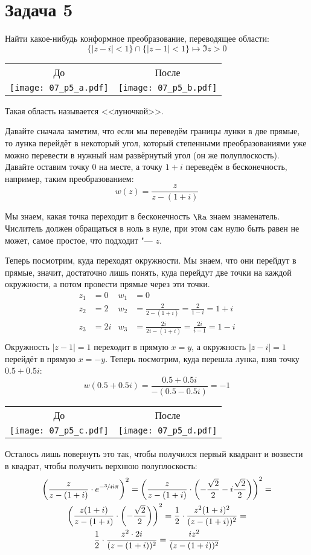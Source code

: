 \section{Задача 5}
	Найти какое-нибудь конформное преобразование, переводящее области:
	\[ \{ |z-i|<1 \} \cap \{ |z-1| < 1 \} \mapsto \Im z > 0 \]
	\begin{center}
		\begin{tabular}{cc}
		До & После \\
		\texttt{[image: 07\_p5\_a.pdf]} & \texttt{[image: 07\_p5\_b.pdf]} \\
		\end{tabular}
	\end{center}
	Такая область называется <<луночкой>>.

	Давайте сначала заметим, что если мы переведём границы лунки в две прямые, то лунка перейдёт в некоторый угол,
	который степенными преобразованиями уже можно перевести в нужный нам развёрнутый угол (он же полуплоскость).
	Давайте оставим точку 0 на месте, а точку $1+i$ переведём в бесконечность, например, таким преобразованием:
	\[ w(z) = \frac{z}{z-(1+i)} \]
	\begin{Rem}
		Мы знаем, какая точка переходит в бесконечность $\Ra$ знаем знаменатель.
		Числитель должен обращаться в ноль в нуле, при этом сам нулю быть равен не может,
		самое простое, что подходит "--- $z$.
	\end{Rem}
	Теперь посмотрим, куда переходят окружности.
	Мы знаем, что они перейдут в прямые, значит, достаточно лишь понять, куда перейдут две точки на каждой окружности,
	а потом провести прямые через эти точки.
	\begin{align*}
		z_1 &= 0 & w_1 &= 0 \\
		z_2 &= 2 & w_2 &= \frac{2}{2-(1+i)} = \frac{2}{1-i} = 1 + i \\
		z_3 &= 2i & w_3 &= \frac{2i}{2i-(1+i)} = \frac{2i}{i-1} = 1-i \\
	\end{align*}
	Окружность $|z-1|=1$ переходит в прямую $x=y$, а окружность $|z-i|=1$ перейдёт в прямую $x=-y$.
	Теперь посмотрим, куда перешла лунка, взяв точку $0.5+0.5i$:
	\[ w(0.5+0.5i) = \frac{0.5+0.5i}{-(0.5-0.5i)} = -1 \]
	\begin{center}
		\begin{tabular}{cc}
		До & После \\
		\texttt{[image: 07\_p5\_c.pdf]} & \texttt{[image: 07\_p5\_d.pdf]} \\
		\end{tabular}
	\end{center}
	Осталось лишь повернуть это так, чтобы получился первый квадрант и возвести в квадрат, чтобы получить верхнюю полуплоскость:
	\begin{gather*}
		\left(\frac{z}{z-(1+i)} \cdot e^{-\sfrac 3 4 i \pi}\right)^2 =
		\left(\frac{z}{z-(1+i)} \cdot \left(-\frac{\sqrt 2}{2} -i\frac{\sqrt 2}{2}\right)\right)^2 = \\
		\left(\frac{z(1+i)}{z-(1+i)} \cdot \left(-\frac{\sqrt 2}{2}\right)\right)^2 =
		\frac12 \cdot \frac{z^2(1+i)^2}{(z-(1+i))^2} = \\
		\frac12 \cdot \frac{z^2\cdot2i}{(z-(1+i))^2} =
		\frac{iz^2}{(z-(1+i))^2}
	\end{gather*}

